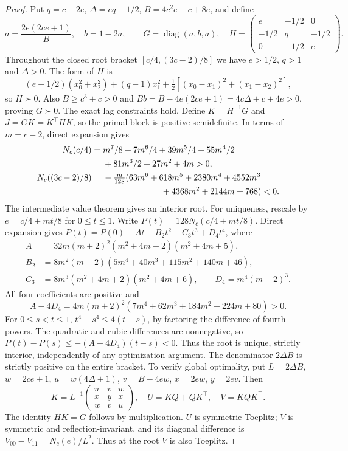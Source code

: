 \documentclass[11pt]{article}
\begin{document}
\begin{proof}
Put $q=c-2e$, $\Delta=eq-1/2$, $B=4c^2e-c+8e$, and define
\[
a=\frac{2e(2ce+1)}B,\quad b=1-2a,\qquad G=\operatorname{diag}(a,b,a),\quad
H=\begin{pmatrix}e&-1/2&0\\-1/2&q&-1/2\\0&-1/2&e\end{pmatrix}.
\]
Throughout the closed root bracket $[c/4,(3c-2)/8]$ we have $e>1/2$, $q>1$ and $\Delta>0$. The form of $H$ is
\[
(e-1/2)(x_0^2+x_2^2)+(q-1)x_1^2+\tfrac12[(x_0-x_1)^2+(x_1-x_2)^2],
\]
so $H\succ0$. Also $B\ge c^3+c>0$ and $Bb=B-4e(2ce+1)=4c\Delta+c+4e>0$, proving $G\succ0$. The exact lag constraints hold. Define $K=H^{-1}G$ and $J=GK=K^\top HK$, so the primal block is positive semidefinite. In terms of $m=c-2$, direct expansion gives
\begin{align*}
N_c(c/4)={}&m^7/8+7m^6/4+39m^5/4+55m^4/2\\
 &+81m^3/2+27m^2+4m>0,\\
N_c((3c-2)/8)={}&-\tfrac m{128}(63m^6+618m^5+2380m^4+4552m^3\\
 &\hspace{24mm}+4368m^2+2144m+768)<0.
\end{align*}
The intermediate value theorem gives an interior root. For uniqueness, rescale by $e=c/4+mt/8$ for $0\le t\le1$. Write $P(t)=128N_c(c/4+mt/8)$. Direct expansion gives $P(t)=P(0)-At-B_2t^2-C_3t^3+D_4t^4$, where
\begin{align*}
A&=32m(m+2)^2(m^2+4m+2)(m^2+4m+5),\\
B_2&=8m^2(m+2)(5m^4+40m^3+115m^2+140m+46),\\
C_3&=8m^3(m^2+4m+2)(m^2+4m+6),\qquad D_4=m^4(m+2)^3.
\end{align*}
All four coefficients are positive and
\[
A-4D_4=4m(m+2)^2(7m^4+62m^3+184m^2+224m+80)>0.
\]
For $0\le s<t\le1$, $t^4-s^4\le4(t-s)$, by factoring the difference of fourth powers. The quadratic and cubic differences are nonnegative, so $P(t)-P(s)\le-(A-4D_4)(t-s)<0$. Thus the root is unique, strictly interior, independently of any optimization argument. The denominator $2\Delta B$ is strictly positive on the entire bracket.
To verify global optimality, put $L=2\Delta B$, $w=2ce+1$, $u=w(4\Delta+1)$, $v=B-4ew$, $x=2ew$, $y=2ev$. Then
\[
K=L^{-1}\begin{pmatrix}u&v&w\\x&y&x\\w&v&u\end{pmatrix},\quad U=KQ+QK^\top,\quad V=KQK^\top.
\]
The identity $HK=G$ follows by multiplication. $U$ is symmetric Toeplitz; $V$ is symmetric and reflection-invariant, and its diagonal difference is $V_{00}-V_{11}=N_c(e)/L^2$. Thus at the root $V$ is also Toeplitz.


\end{proof}
\end{document}
